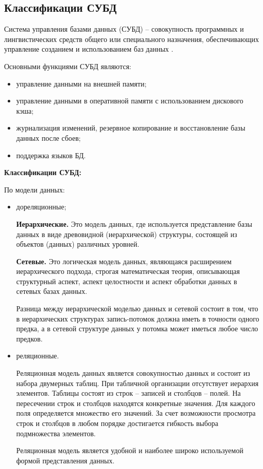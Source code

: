 \subsection{Классификации СУБД}

Система управления базами данных (СУБД) – совокупность программных и лингвистических средств общего или специального назначения, обеспечивающих управление созданием и использованием баз данных \cite{subd_opr}.

Основными функциями СУБД являются:
\begin{itemize}
	\item управление данными на внешней памяти;
	\item управление данными в оперативной памяти с использованием дискового кэша;
	\item журнализация изменений, резервное копирование и восстановление базы данных после сбоев;
	\item поддержка языков БД.
\end{itemize}

\textbf{Классификации СУБД:}

По модели данных:
\begin{itemize}
	\item дореляционные;
	
	\textbf{Иерархические.} Это модель данных, где используется представление базы данных в виде древовидной (иерархической) структуры, состоящей из объектов (данных) различных уровней.
	
	\textbf{Сетевые.} Это логическая модель данных, являющаяся расширением иерархического подхода, строгая математическая теория, описывающая структурный аспект, аспект целостности и аспект обработки данных в сетевых базах данных.
	
	Разница между иерархической моделью данных и сетевой состоит в том, что в иерархических структурах запись-потомок должна иметь в точности одного предка, а в сетевой структуре данных у потомка может иметься любое число предков.
	
	\item реляционные.
	
	Реляционная модель данных является совокупностью данных и состоит из набора двумерных таблиц. При табличной организации отсутствует иерархия элементов. Таблицы состоят из строк – записей и столбцов – полей. На пересечении строк и столбцов находятся конкретные значения. Для каждого поля определяется множество его значений. За счет возможности просмотра строк и столбцов в любом порядке достигается гибкость выбора подмножества элементов.
	
	Реляционная модель является удобной и наиболее широко используемой формой представления данных.
	
\end{itemize}

